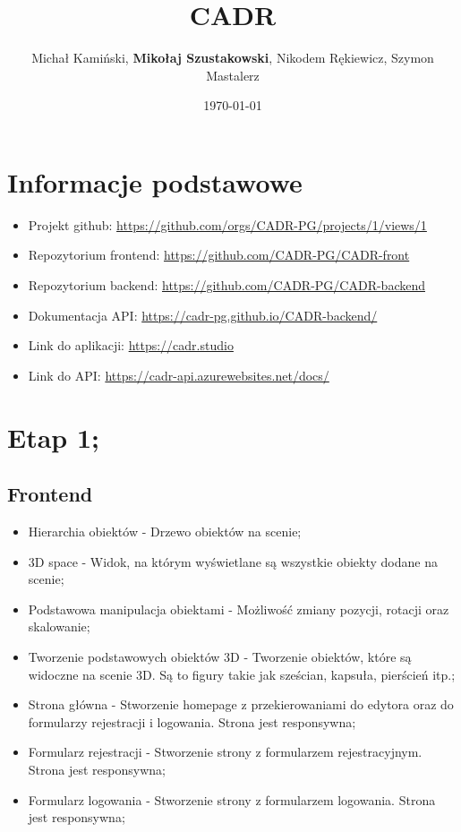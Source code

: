\documentclass[11pt]{article}
\author{Michał Kamiński, \textbf{Mikołaj Szustakowski}, Nikodem Rękiewicz, Szymon Mastalerz}
\date{\today}
\title{CADR}
\begin{document}
\maketitle
\tableofcontents

\section{Informacje podstawowe}
\label{sec:orgddcdb38}
\begin{itemize}
\item Projekt github: \url{https://github.com/orgs/CADR-PG/projects/1/views/1}
\item Repozytorium frontend: \url{https://github.com/CADR-PG/CADR-front}
\item Repozytorium backend: \url{https://github.com/CADR-PG/CADR-backend}
\item Dokumentacja API: \url{https://cadr-pg.github.io/CADR-backend/}
\item Link do aplikacji: \url{https://cadr.studio}
\item Link do API: \url{https://cadr-api.azurewebsites.net/docs/}
\end{itemize}
\section{Etap 1;}
\label{sec:org4795816}
\subsection{Frontend}
\label{sec:orgf6afb18}
\begin{itemize}
\item Hierarchia obiektów - Drzewo obiektów na scenie;
\item 3D space - Widok, na którym wyświetlane są wszystkie obiekty dodane na scenie;
\item Podstawowa manipulacja obiektami - Możliwość zmiany pozycji, rotacji oraz skalowanie;
\item Tworzenie podstawowych obiektów 3D - Tworzenie obiektów, które są widoczne na scenie 3D. Są to figury takie jak sześcian, kapsuła, pierścień itp.;
\item Strona główna - Stworzenie homepage z przekierowaniami do edytora oraz do formularzy rejestracji i logowania. Strona jest responsywna;
\item Formularz rejestracji - Stworzenie strony z formularzem rejestracyjnym. Strona jest responsywna;
\item Formularz logowania -  Stworzenie strony z formularzem logowania. Strona jest responsywna;
\end{itemize}
\end{document}
